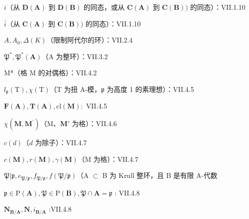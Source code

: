 \(i\)（从 \(\mathbf{D}(\mathbf{A})\) 到 \(\mathbf{D}(\mathbf{B})\) 的同态，或从 \(\mathbf{C}(\mathbf{A})\) 到 \(\mathbf{C}(\mathbf{B}))\) 的同态）：VII.1.10

\(\bar{i}\)（从 \(\mathbf{C}(\mathbf{A})\) 到 \(\mathbf{C}(\mathbf{B}))\) 的同态）：VII.1.10

\(A, A_{0}, \Delta(K)\)（限制阿代尔的环）：VII.2.4

\(\mathfrak{P}^*, \mathfrak{P}^*(\mathbf{A})\)（A 为整环）：VII.3.2

M*（格 M 的对偶格）：VII.4.2

\(l_{\mathfrak{p}}(\mathrm{T}), \chi (\mathrm{T})\)（T 为扭 A-模，\(\mathfrak{p}\) 为高度 1 的素理想）：VII.4.5

\(\pmb {F}(\mathbf{A}),\pmb{T}(\mathbf{A}),\mathrm{cl}(\mathbf{M}):\) VII.4.5

\(\chi (\mathbf{M},\mathbf{M}^{\prime})\)（M、\(\mathbf{M}'\) 为格）：VII.4.6

\(c(d)\)（\(d\) 为除子）：VII.4.7

\(c(\mathbf{M}), r(\mathbf{M}), \gamma(\mathbf{M})\)（M 为格）：VII.4.7

\(\mathfrak{P}|\mathfrak{p},e_{\mathfrak{P} / \mathfrak{p}},f_{\mathfrak{P} / \mathfrak{p}},f(\mathfrak{P} / \mathfrak{p})\)（A \(\subset\) B 为 Krull 整环，且 B 是有限 A-代数

\(\mathfrak{p} \in \mathrm{P}(\mathbf{A}), \mathfrak{P} \in \mathrm{P}(\mathbf{B}), \mathfrak{P} \cap \mathbf{A} = \mathfrak{p}\) : VII.4.8

\(\mathbf{N}_{\mathbf{B} / \mathbf{A}},\mathbf{N},i_{\mathbf{B} / \mathbf{A}}\) :VII.4.8

